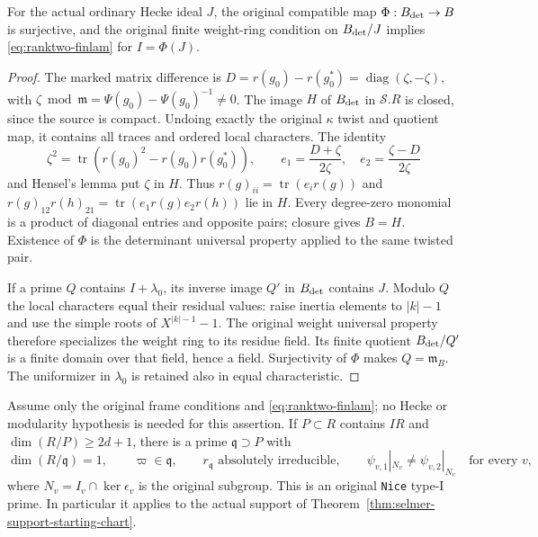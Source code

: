 \begin{lemma}\label{lem:ranktwo-finlam-transfer}
For the actual ordinary Hecke ideal $J$, the original compatible map
$\Phi:B_{\rm det}\to B$ is surjective, and the original finite
weight-ring condition on $B_{\rm det}/J$ implies
\eqref{eq:ranktwo-finlam} for $I=\Phi(J)$.
\end{lemma}
\begin{proof}
The marked matrix difference is
$D=r(g_0)-r(g_0^*)=\operatorname{diag}(\zeta,-\zeta)$, with
$\zeta\bmod\mathfrak m=\Psi(g_0)-\Psi(g_0)^{-1}\ne0$.
The image $H$ of $B_{\rm det}$ in $\mathscr S.R$ is closed, since
the source is compact.  Undoing exactly the original $\kappa$ twist
and quotient map, it contains all traces and ordered local characters.
The identity
\[
 \zeta^2=\operatorname{tr}(r(g_0)^2-r(g_0)r(g_0^*)),\qquad
 e_1=\frac{D+\zeta}{2\zeta},\quad e_2=\frac{\zeta-D}{2\zeta}
\]
and Hensel's lemma put $\zeta$ in $H$.  Thus
$r(g)_{ii}=\operatorname{tr}(e_i r(g))$ and
$r(g)_{12}r(h)_{21}=\operatorname{tr}(e_1r(g)e_2r(h))$ lie in $H$.
Every degree-zero monomial is a product of diagonal entries and
opposite pairs; closure gives $B=H$.  Existence of $\Phi$ is the
determinant universal property applied to the same twisted pair.

If a prime $Q$ contains $I+\lambda_0$, its inverse image $Q'$ in
$B_{\rm det}$ contains $J$.  Modulo $Q$ the local characters equal
their residual values: raise inertia elements to $|k|-1$ and use the
simple roots of $X^{|k|-1}-1$.  The original weight universal property
therefore specializes the weight ring to its residue field.  Its
finite quotient $B_{\rm det}/Q'$ is a finite domain over that field,
hence a field.  Surjectivity of $\Phi$ makes $Q=\mathfrak m_B$.
The uniformizer in $\lambda_0$ is retained also in equal characteristic.
\end{proof}

\begin{theorem}
\label{thm:ranktwo-characteristic-curve}
Assume only the original frame conditions and
\eqref{eq:ranktwo-finlam}; no Hecke or modularity hypothesis is
needed for this assertion.  If $P\subset R$ contains $IR$ and
$\dim(R/P)\ge2d+1$, there is a prime $\mathfrak q\supset P$ with
\[
 \dim(R/\mathfrak q)=1,\qquad \varpi\in\mathfrak q,
 \qquad r_{\mathfrak q}\text{ absolutely irreducible},\qquad
 \psi_{v,1}|_{N_v}\ne\psi_{v,2}|_{N_v}\quad\text{for every }v,
\]
where $N_v=I_v\cap\ker\epsilon_v$ is the original subgroup.
This is an original \texttt{Nice} type-I prime.  In particular it
applies to the actual support of
Theorem~\ref{thm:selmer-support-starting-chart}.
\end{theorem}

